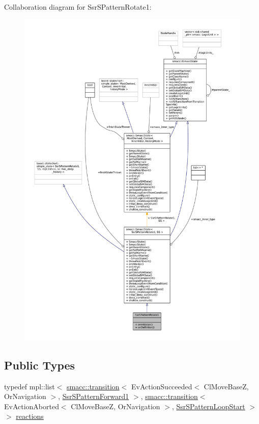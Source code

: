 Collaboration diagram for Ssr\+S\+Pattern\+Rotate1\+:
\nopagebreak
\begin{figure}[H]
\begin{center}
\leavevmode
\includegraphics[width=350pt]{structSsrSPatternRotate1__coll__graph}
\end{center}
\end{figure}
\subsection*{Public Types}
\begin{DoxyCompactItemize}
\item 
typedef mpl\+::list$<$ \hyperlink{classsmacc_1_1transition}{smacc\+::transition}$<$ Ev\+Action\+Succeeded$<$ Cl\+Move\+BaseZ, Or\+Navigation $>$, \hyperlink{structSsrSPatternForward1}{Ssr\+S\+Pattern\+Forward1} $>$, \hyperlink{classsmacc_1_1transition}{smacc\+::transition}$<$ Ev\+Action\+Aborted$<$ Cl\+Move\+BaseZ, Or\+Navigation $>$, \hyperlink{structSsrSPatternLoopStart}{Ssr\+S\+Pattern\+Loop\+Start} $>$ $>$ \hyperlink{structSsrSPatternRotate1_ab760ca2d3f45079aa96171c6436654cb}{reactions}
\end{DoxyCompactItemize}
